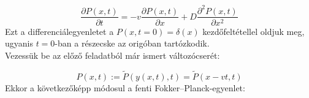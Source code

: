\begin{equation}
    \frac{\partial P \left( x, t \right)}{\partial t}
    =
    -
    v \frac{\partial P \left( x, t \right)}{\partial x}
    +
    D \frac{\partial^{2} P \left( x, t \right)}{\partial x^{2}}
\end{equation}
Ezt a differenciálegyenletet a $P \left( x, t = 0 \right) = \delta \left( x \right)$ kezdőfeltétellel oldjuk meg, ugyanis $t = 0$-ban a részecske az origóban tartózkodik. \\
Vezessük be az előző feladatból már ismert változócserét:

\begin{equation*}
    P \left( x, t \right)
    :=
    \tilde{P} \left( y \left( x, t \right), t \right)
    =
    \tilde{P} \left( x - vt, t \right)
\end{equation*}
Ekkor a következőképp módosul a fenti Fokker--Planck-egyenlet:

